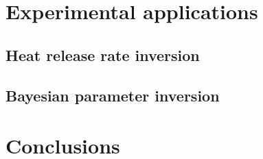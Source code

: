 \documentclass{article}
\begin{document}
\section{Experimental applications}
\subsection{Heat release rate inversion}
\subsection{Bayesian parameter inversion}
\section{Conclusions}


\end{document}
